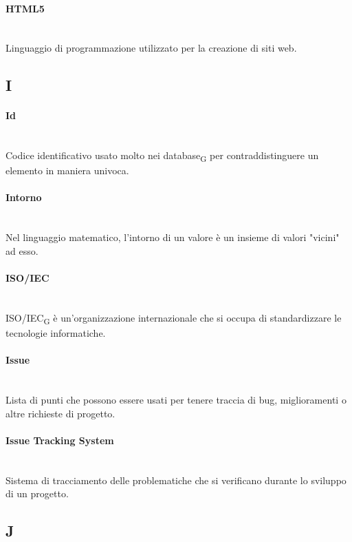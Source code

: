 \paragraph{HTML5}~\smallskip \\
Linguaggio di programmazione utilizzato per la creazione di siti web.
\newpage
{}
\subsection*{I}
\paragraph{Id}~\smallskip \\
Codice identificativo usato molto nei database\textsubscript{G} per contraddistinguere un elemento in maniera univoca.

\paragraph{Intorno}~\smallskip \\
Nel linguaggio matematico, l'intorno di un valore è un insieme di valori "vicini" ad esso.

\paragraph{ISO/IEC}~\smallskip \\
ISO/IEC\textsubscript{G} è un'organizzazione internazionale che si occupa di standardizzare le tecnologie informatiche.

\paragraph{Issue}~\smallskip \\
Lista di punti che possono essere usati per tenere traccia di bug, miglioramenti o altre richieste di progetto.

\paragraph{Issue Tracking System}~\smallskip \\
Sistema di tracciamento delle problematiche che si verificano durante lo sviluppo di un progetto.
\newpage
{}
\subsection*{J}
